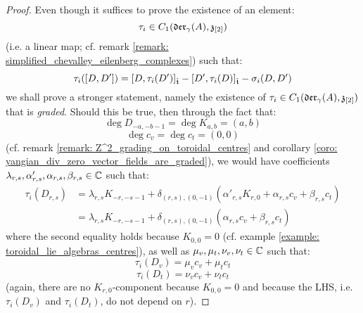            \begin{proof}
                Even though it suffices to prove the existence of an element:
                    $$\tau_i \in C_1(\mathfrak{der}_{\gamma}(A), \mathfrak{z}_{[2]})$$
                (i.e. a linear map; cf. remark \ref{remark: simplified_chevalley_eilenberg_complexes}) such that:
                    $$\tau_i([D, D']) = [D, \tau_i(D')]_{\hat{\mathfrak{t}}} - [D', \tau_i(D)]_{\hat{\mathfrak{t}}} - \sigma_i(D, D')$$
                we shall prove a stronger statement, namely the existence of $\tau_i \in C_1(\mathfrak{der}_{\gamma}(A), \mathfrak{z}_{[2]})$ that is \textit{graded}. Should this be true, then through the fact that:
                    $$\deg D_{-a, -b - 1} = \deg K_{a, b} = (a, b)$$
                    $$\deg c_v = \deg c_t = (0, 0)$$
                (cf. remark \ref{remark: Z^2_grading_on_toroidal_centres} and corollary \ref{coro: yangian_div_zero_vector_fields_are_graded}), we would have coefficients $\lambda_{r, s}, \alpha'_{r, s}, \alpha_{r, s}, \beta_{r, s} \in \mathbb{C}$ such that:
                    $$
                        \begin{aligned}
                            \tau_i(D_{r, s}) & = \lambda_{r, s} K_{-r, -s - 1} + \delta_{(r, s), (0, -1)} ( \alpha'_{r, s} K_{r, 0} + \alpha_{r, s} c_v + \beta_{r, s} c_t )
                            \\
                            & = \lambda_{r, s} K_{-r, -s - 1} + \delta_{(r, s), (0, -1)} ( \alpha_{r, s} c_v + \beta_{r, s} c_t )
                        \end{aligned}
                    $$
                where the second equality holds because $K_{0, 0} = 0$ (cf. example \ref{example: toroidal_lie_algebras_centres}), as well as $\mu_v, \mu_t, \nu_v, \nu_t \in \mathbb{C}$ such that:
                    $$\tau_i(D_v) = \mu_v c_v + \mu_t c_t$$
                    $$\tau_i(D_t) = \nu_v c_v + \nu_t c_t$$
                (again, there are no $K_{r, 0}$-component because $K_{0, 0} = 0$ and because the LHS, i.e. $\tau_i(D_v)$ and $ \tau_i(D_t)$, do not depend on $r$).
                

\end{proof}
